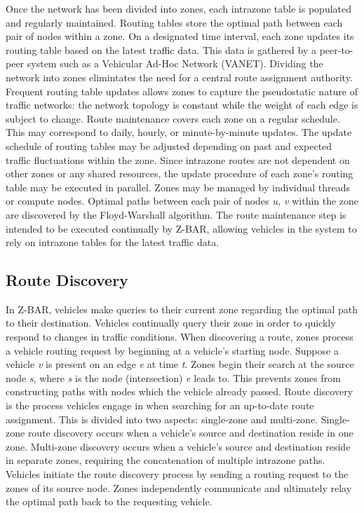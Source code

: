 \documentclass[conference]{IEEEtran}
\begin{document}
Once the network has been divided into zones, each intrazone table is populated and regularly maintained. Routing tables store the optimal path between each pair of nodes within a zone. On a designated time interval, each zone updates its routing table based on the latest traffic data. This data is gathered by a peer-to-peer system such as a Vehicular Ad-Hoc Network (VANET). Dividing the network into zones elimintates the need for a central route assignment authority. Frequent routing table updates allows zones to capture the pseudostatic nature of traffic networks: the network topology is constant while the weight of each edge is subject to change. Route maintenance covers each zone on a regular schedule. This may correspond to daily, hourly, or minute-by-minute updates. The update schedule of routing tables may be adjusted depending on past and expected traffic fluctuations within the zone. Since intrazone routes are not dependent on other zones or any shared resources, the update procedure of each zone's routing table may be executed in parallel. Zones may be managed by individual threads or compute nodes. Optimal paths between each pair of nodes \textit{u, v} within the zone are discovered by the Floyd-Warshall algorithm. The route maintenance step is intended to be executed continually by Z-BAR, allowing vehicles in the system to rely on intrazone tables for the latest traffic data.

\subsection{Route Discovery}

In Z-BAR, vehicles make queries to their current zone regarding the optimal path to their destination. Vehicles continually query their zone in order to quickly respond to changes in traffic conditions. When discovering a route, zones process a vehicle routing request by beginning at a vehicle's starting node. Suppose a vehicle \textit{v} is present on an edge \textit{e} at time \textit{t}. Zones begin their search at the source node \textit{s}, where \textit{s} is the node (intersection) \textit{e} leads to. This prevents zones from constructing paths with nodes which the vehicle already passed. Route discovery is the process vehicles engage in when searching for an up-to-date route assignment. This is divided into two aspects: single-zone and multi-zone. Single-zone route discovery occurs when a vehicle's source and destination reside in one zone. Multi-zone discovery occurs when a vehicle's source and destination reside in separate zones, requiring the concatenation of multiple intrazone paths. Vehicles initiate the route discovery process by sending a routing request to the zones of its source node. Zones independently communicate and ultimately relay the optimal path back to the requesting vehicle.
\end{document}
